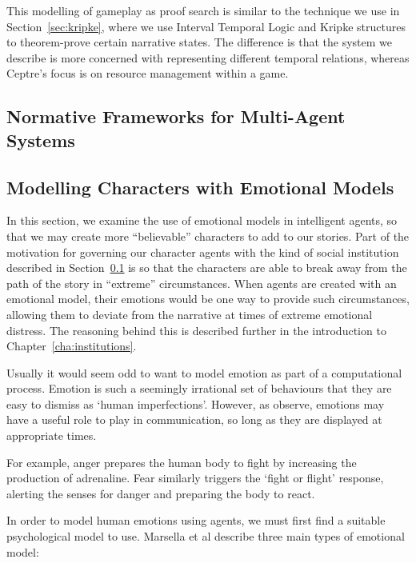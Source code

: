 \documentclass[11pt]{report}
\begin{document}
This modelling of gameplay as proof search is similar to the technique we use in
Section~\ref{sec:kripke}, where we use Interval Temporal Logic and Kripke structures to
theorem-prove certain narrative states. The difference is that the system we
describe is more concerned with representing different temporal relations,
whereas Ceptre's focus is on resource management within a game.

\subsection{Normative Frameworks for Multi-Agent Systems}\label{sec:lit-insts}


\subsection{Modelling Characters with Emotional Models}\label{sec:emotional-models}
In this section, we examine the use of emotional models in intelligent agents,
so that we may create more ``believable'' characters to add to our stories. Part
of the motivation for governing our character agents with the kind of social
institution described in Section~\ref{sec:lit-insts} is so that the characters
are able to break away from the path of the story in ``extreme'' circumstances.
When agents are created with an emotional model, their emotions would be one way
to provide such circumstances, allowing them to deviate from the narrative at
times of extreme emotional distress. The reasoning behind this is described further in the introduction to
Chapter~\ref{cha:institutions}.

Usually it would seem odd to want to model emotion as part of a computational process. Emotion is such a seemingly irrational set of behaviours that they are easy to dismiss as `human imperfections'. However, as \citet{gratch2004domain} observe, emotions may have a useful role to play in communication, so long as they are displayed at appropriate times.

For example, anger prepares the human body to fight by increasing the production of adrenaline. Fear similarly triggers the `fight or flight' response, alerting the senses for danger and preparing the body to react.

In order to model human emotions using agents, we must first find a suitable psychological model to use. Marsella et al describe three main types of emotional model:
\end{document}
